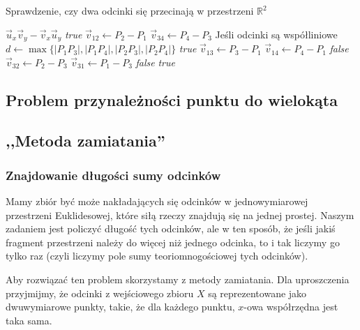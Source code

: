 \begin{algorithm}[H]
	\caption{Sprawdzenie, czy dwa odcinki się przecinają w przestrzeni $\mathbb{R}^2$}
	\begin{algorithmic}[1]
		\State \Return $\vec{u}_x \vec{v}_y - \vec{v}_x \vec{u}_y$
		\EndProcedure
		\State \Return \textit{true}
		\EndIf
		\State $\vec{v}_{12} \gets P_2 - P_1$
		\State $\vec{v}_{34} \gets P_4 - P_3$
		 \Comment Jeśli odcinki są współliniowe
		\State $d \gets \max\{|P_1P_3|, |P_1P_4|, |P_2P_3|, |P_2P_4|\}$
		\State \Return \textit{true}
		\EndIf
		\EndIf
		\State $\vec{v}_{13} \gets P_3 - P_1$
		\State $\vec{v}_{14} \gets P_4 - P_1$
		\State \Return \textit{false}
		\EndIf
		\State $\vec{v}_{32} \gets P_2 - P_3$
		\State $\vec{v}_{31} \gets P_1 - P_3$
		\State \Return \textit{false}
		\EndIf
		\State \Return \textit{true}
		\EndProcedure
	\end{algorithmic}
	\label{segment_intersection_r2}
\end{algorithm}


\subsection{Problem przynależności punktu do wielokąta}


\subsection{,,Metoda zamiatania''}
\subsubsection{Znajdowanie długości sumy odcinków}
Mamy zbiór być może nakładających się odcinków w jednowymiarowej przestrzeni Euklidesowej, które siłą rzeczy
znajdują się na jednej prostej. Naszym zadaniem jest policzyć długość tych odcinków, ale w ten sposób, że jeśli jakiś
fragment przestrzeni należy do więcej niż jednego odcinka, to i tak liczymy go tylko raz (czyli liczymy pole sumy
teoriomnogościowej tych odcinków).

Aby rozwiązać ten problem skorzystamy z metody zamiatania. Dla
uproszczenia przyjmijmy, że odcinki z wejściowego zbioru $X$ są reprezentowane
jako dwuwymiarowe punkty, takie, że dla każdego punktu, $x$-owa
współrzędna jest taka sama.


